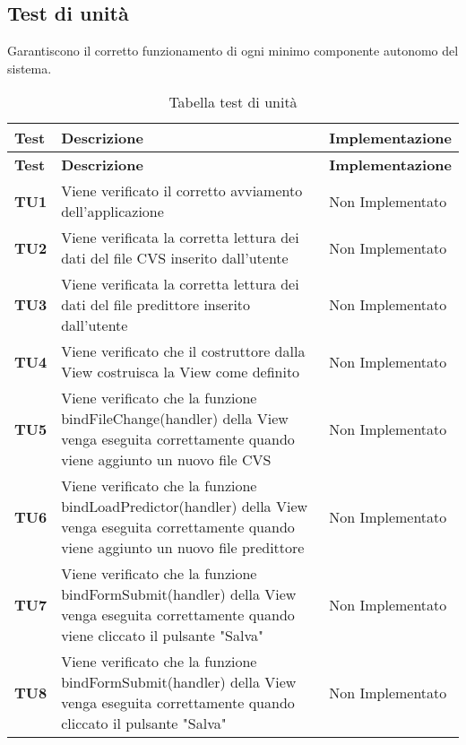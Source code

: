 \documentclass[../piano-di-qualifica.tex]{subfiles}
\begin{document}
\subsection{Test di unità}
\label{sub:test_di_unita}
Garantiscono il corretto funzionamento di ogni minimo componente autonomo del sistema.

\renewcommand{\arraystretch}{2} %
\begin{longtable}[H]{>{\centering\bfseries}m{2.5cm} >{\centering}m{7.5cm} >{\centering\arraybackslash}m{3.5cm}}
  \caption{Tabella test di unità}%
  \label{tab:tabella_test_di_unita}                                                    \\
  \rowcolor{lightgray}
  {\textbf{Test}} & {\textbf{Descrizione}} & {\textbf{Implementazione}}  \\
  \endfirsthead%
  \rowcolor{lightgray}
  {\textbf{Test}} & {\textbf{Descrizione}} & {\textbf{Implementazione}}  \\
  \endhead%
  \rowcolor{white}
  \multicolumn{3}{c}{\textit{Continua alla pagina successiva}}
  \endfoot%
  \endlastfoot%
  \textbf{TU1} & Viene verificato il corretto avviamento dell'applicazione & Non Implementato \\
  \textbf{TU2} & Viene verificata la corretta lettura dei dati del file CVS inserito dall'utente & Non Implementato \\
  \textbf{TU3} & Viene verificata la corretta lettura dei dati del file predittore inserito dall'utente & Non Implementato \\
  \textbf{TU4} & Viene verificato che il costruttore dalla View costruisca la View come definito & Non Implementato \\
  \textbf{TU5} & Viene verificato che la funzione bindFileChange(handler) della View venga eseguita correttamente quando viene aggiunto un nuovo file CVS & Non Implementato \\
  \textbf{TU6} & Viene verificato che la funzione bindLoadPredictor(handler) della View venga eseguita correttamente quando viene aggiunto un nuovo file predittore & Non Implementato \\
  \textbf{TU7} & Viene verificato che la funzione bindFormSubmit(handler) della View venga eseguita correttamente quando viene cliccato il pulsante "Salva" & Non Implementato \\
  \textbf{TU8} & Viene verificato che la funzione bindFormSubmit(handler) della View venga eseguita correttamente quando cliccato il pulsante "Salva" & Non Implementato \\

\end{longtable}
\end{document}
